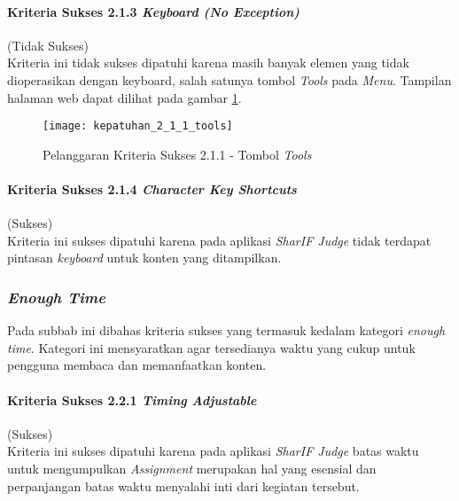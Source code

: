 \paragraph{Kriteria Sukses 2.1.3 \textit{Keyboard (No Exception)}}
\label{subsubsec:kepatuhan_kriteria_2.1.3}
(Tidak Sukses) \\

Kriteria ini tidak sukses dipatuhi karena masih banyak elemen yang tidak dioperasikan dengan keyboard, salah satunya tombol \textit{Tools} pada \textit{Menu}. Tampilan halaman web dapat dilihat pada gambar \ref{fig:kepatuhan_2_1_3_tools}.
\begin{figure}[H]
	\centering  
	\texttt{[image: kepatuhan\_2\_1\_1\_tools]}  
	\caption[Pelanggaran Kriteria Sukses 2.1.1 - Tombol \textit{Tools}]{Pelanggaran Kriteria Sukses 2.1.1 - Tombol \textit{Tools}} 
	\label{fig:kepatuhan_2_1_3_tools} 
\end{figure}

\paragraph{Kriteria Sukses 2.1.4 \textit{Character Key Shortcuts}}
\label{subsubsec:kepatuhan_kriteria_2.1.4}
(Sukses) \\

Kriteria ini sukses dipatuhi karena pada aplikasi \textit{SharIF Judge} tidak terdapat pintasan \textit{keyboard} untuk konten yang ditampilkan.

\subsubsection{\textit{Enough Time}}
\label{subsubsec:enough_time}

Pada subbab ini dibahas kriteria sukses yang termasuk kedalam kategori \textit{enough time}. Kategori ini mensyaratkan agar tersedianya waktu yang cukup untuk pengguna membaca dan memanfaatkan konten.

\paragraph{Kriteria Sukses 2.2.1 \textit{Timing Adjustable}}
\label{subsubsec:kepatuhan_kriteria_2.2.1}
(Sukses) \\

Kriteria ini sukses dipatuhi karena pada aplikasi \textit{SharIF Judge} batas waktu untuk mengumpulkan \textit{Assignment} merupakan hal yang esensial dan perpanjangan batas waktu menyalahi inti dari kegiatan tersebut.

